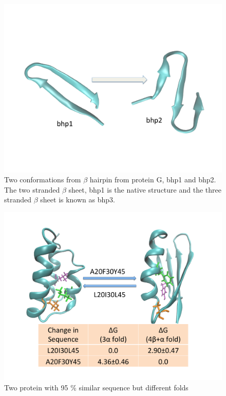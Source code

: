 \documentclass[12pt]{article}
\begin{document}
\begin{figure}
\begin{center}
\includegraphics[width=3.5 in,height=3.0 in]{bhp.pdf}
\end{center}
\caption{Two conformations from $\beta$ hairpin from protein G, bhp1 and bhp2. The two stranded $\beta$ sheet, bhp1 is the native structure and the three stranded $\beta$ sheet is known as bhp3.}
\label{fig:bhp_conf}
\end{figure}

\begin{figure}
\begin{center}
\includegraphics[width=3.5 in,height=3.0 in]{G95.pdf}
\end{center}
\caption{Two protein with 95 \% similar sequence but different folds}
\label{fig:G95}
\end{figure}
\end{document}

